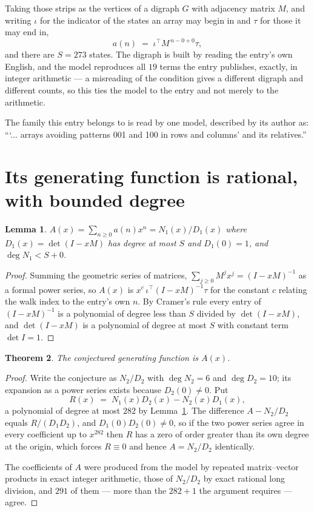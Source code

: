 \documentclass[11pt,a4paper]{article}
\theoremstyle{plain}
\newtheorem{theorem}{Theorem}
\newtheorem{lemma}[theorem]{Lemma}
\theoremstyle{definition}
\begin{document}
Taking those strips as the vertices of a digraph $G$ with adjacency matrix $M$, and writing
$\iota$ for the indicator of the states an array may begin in and $\tau$ for those it may end
in,
\[
a(n)\;=\;\iota^{\!\top}M^{\,n-0+0}\tau ,
\]
and there are $S=273$ states. The digraph is built by reading the entry's own English, and the
model reproduces all $19$ terms the entry publishes, exactly, in integer arithmetic --- a
misreading of the condition gives a different digraph and different counts, so this ties the
model to the entry and not merely to the arithmetic.

The family this entry belongs to is read by one model, described by its author as: ```... arrays avoiding patterns 001 and 100 in rows and columns' and its relatives.''


\section{Its generating function is rational, with bounded degree}

\begin{lemma}\label{lem:rat}
$A(x)=\sum_{n\ge0}a(n)x^n=N_1(x)/D_1(x)$ where $D_1(x)=\det(I-xM)$ has degree at most
$S$ and $D_1(0)=1$, and $\deg N_1<S+0$.
\end{lemma}

\begin{proof}
Summing the geometric series of matrices, $\sum_{j\ge0}M^jx^j=(I-xM)^{-1}$ as a formal
power series, so $A(x)$ is $x^{c}\,\iota^{\!\top}(I-xM)^{-1}\tau$ for the constant $c$
relating the walk index to the entry's own $n$. By Cramer's rule every entry of
$(I-xM)^{-1}$ is a polynomial of degree less than $S$ divided by $\det(I-xM)$, and
$\det(I-xM)$ is a polynomial of degree at most $S$ with constant term $\det I=1$.
\end{proof}

\begin{theorem}
The conjectured generating function is $A(x)$.
\end{theorem}

\begin{proof}
Write the conjecture as $N_2/D_2$ with $\deg N_2=6$ and $\deg D_2=10$; its expansion as a
power series exists because $D_2(0)\neq0$. Put
\[
R(x)\;=\;N_1(x)D_2(x)-N_2(x)D_1(x),
\]
a polynomial of degree at most $282$ by Lemma~\ref{lem:rat}. The difference
$A-N_2/D_2$ equals $R/(D_1D_2)$, and $D_1(0)D_2(0)\neq0$, so if the two power series agree in
every coefficient up to $x^{282}$ then $R$ has a zero of order greater than its own
degree at the origin, which forces $R\equiv0$ and hence $A=N_2/D_2$ identically.

The coefficients of $A$ were produced from the model by repeated matrix--vector products in
exact integer arithmetic, those of $N_2/D_2$ by exact rational long division, and $291$
of them --- more than the $282+1$ the argument requires --- agree.
\end{proof}
\end{document}
